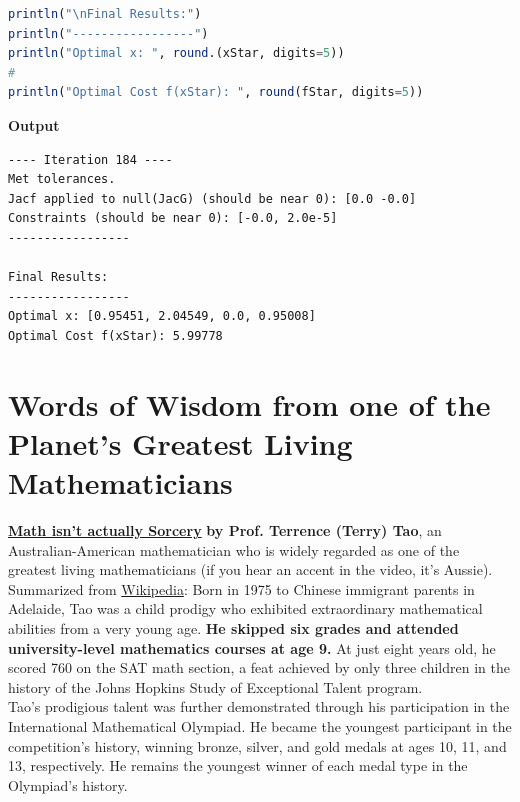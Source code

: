\begin{lstlisting}[language=Julia,style=mystyle]
println("\nFinal Results:")
println("-----------------")
println("Optimal x: ", round.(xStar, digits=5))
#
println("Optimal Cost f(xStar): ", round(fStar, digits=5))

\end{lstlisting}
\textbf{Output} 
\begin{verbatim}
---- Iteration 184 ----
Met tolerances.
Jacf applied to null(JacG) (should be near 0): [0.0 -0.0]
Constraints (should be near 0): [-0.0, 2.0e-5]
----------------- 

Final Results:
-----------------
Optimal x: [0.95451, 2.04549, 0.0, 0.95008]
Optimal Cost f(xStar): 5.99778
\end{verbatim}





\section{Words of Wisdom from one of the Planet's Greatest Living Mathematicians}

\href{https://youtube.com/shorts/k2QVCfoW7uI?si=vhh7jRLSrJoGpHjz}{\bf Math isn't actually Sorcery} \textbf{by Prof. Terrence (Terry) Tao}, an Australian-American mathematician who is widely regarded as one of the greatest living mathematicians (if you hear an accent in the video, it's Aussie). \\

Summarized from \href{https://en.wikipedia.org/wiki/Terence_Tao}{Wikipedia}: Born in 1975 to Chinese immigrant parents in Adelaide, Tao was a child prodigy who exhibited extraordinary mathematical abilities from a very young age. \textbf{He skipped six grades and attended university-level mathematics courses at age 9.} At just eight years old, he scored 760 on the SAT math section, a feat achieved by only three children in the history of the Johns Hopkins Study of Exceptional Talent program.\\

Tao's prodigious talent was further demonstrated through his participation in the International Mathematical Olympiad. He became the youngest participant in the competition's history, winning bronze, silver, and gold medals at ages 10, 11, and 13, respectively. He remains the youngest winner of each medal type in the Olympiad's history.\\



